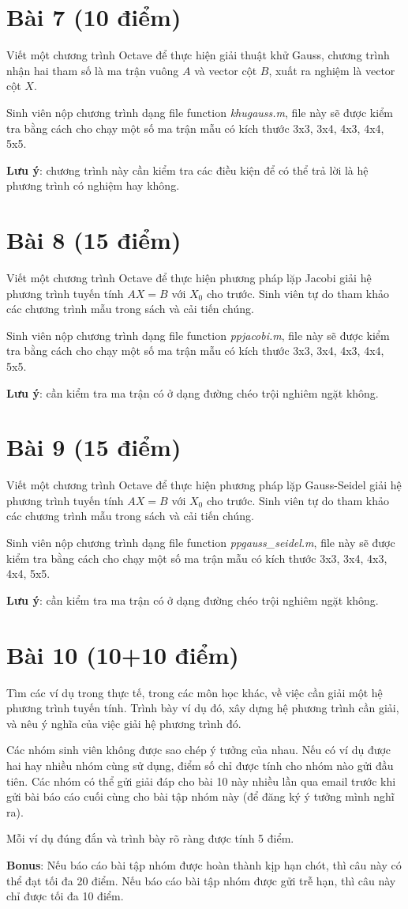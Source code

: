 \documentclass[12pt]{article}
\begin{document}
\section{Bài 7 (10 điểm)}
Viết một chương trình Octave để thực hiện giải thuật khử Gauss, chương trình nhận hai tham số là ma trận vuông $A$ và vector cột $B$, xuất ra nghiệm là vector cột $X$.

Sinh viên nộp chương trình dạng file function \emph{khugauss.m}, file này sẽ được kiểm tra bằng cách cho chạy một số ma trận mẫu có kích thước 3x3, 3x4, 4x3, 4x4, 5x5.

\textbf{Lưu ý}: chương trình này cần kiểm tra các điều kiện để có thể trả lời là hệ phương trình có nghiệm hay không.

\section{Bài 8 (15 điểm)}
Viết một chương trình Octave để thực hiện phương pháp lặp Jacobi giải hệ phương trình tuyến tính $AX=B$ với $X_0$ cho trước. Sinh viên tự do tham khảo các chương trình mẫu trong sách và cải tiến chúng.

Sinh viên nộp chương trình dạng file function \emph{ppjacobi.m}, file này sẽ được kiểm tra bằng cách cho chạy một số ma trận mẫu có kích thước 3x3, 3x4, 4x3, 4x4, 5x5.

\textbf{Lưu ý}: cần kiểm tra ma trận có ở dạng đường chéo trội nghiêm ngặt không.

\section{Bài 9 (15 điểm)}
Viết một chương trình Octave để thực hiện phương pháp lặp Gauss-Seidel giải hệ phương trình tuyến tính $AX=B$ với $X_0$ cho trước. Sinh viên tự do tham khảo các chương trình mẫu trong sách và cải tiến chúng.

Sinh viên nộp chương trình dạng file function \emph{ppgauss\_seidel.m}, file này sẽ được kiểm tra bằng cách cho chạy một số ma trận mẫu có kích thước 3x3, 3x4, 4x3, 4x4, 5x5.

\textbf{Lưu ý}: cần kiểm tra ma trận có ở dạng đường chéo trội nghiêm ngặt không.

\section{Bài 10 (10+10 điểm)}
Tìm các ví dụ trong thực tế, trong các môn học khác, về việc cần giải một hệ phương trình tuyến tính. Trình bày ví dụ đó, xây dựng hệ phương trình cần giải, và nêu ý nghĩa của việc giải hệ phương trình đó.

Các nhóm sinh viên không được sao chép ý tưởng của nhau. Nếu có ví dụ được hai hay nhiều nhóm cùng sử dụng, điểm số chỉ được tính cho nhóm nào gửi đầu tiên. Các nhóm có thể gửi giải đáp cho bài 10 này nhiều lần qua email trước khi gửi bài báo cáo cuối cùng cho bài tập nhóm này (để đăng ký ý tưởng mình nghĩ ra).

Mỗi ví dụ đúng đắn và trình bày rõ ràng được tính 5 điểm.

\textbf{Bonus}: Nếu báo cáo bài tập nhóm được hoàn thành kịp hạn chót, thì câu này có thể đạt tối đa 20 điểm. Nếu báo cáo bài tập nhóm được gửi trễ hạn, thì câu này chỉ được tối đa 10 điểm.
\end{document}
